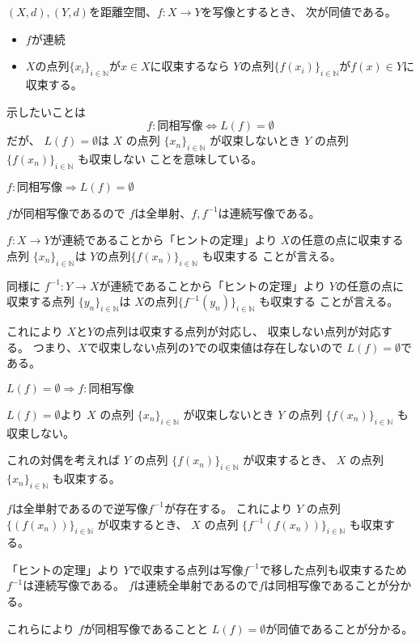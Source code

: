 \documentclass[12pt,b5paper]{ltjsarticle}
\begin{document}
$(X,d),(Y,d)$を距離空間、$f:X\to Y$を写像とするとき、
次が同値である。
\begin{itemize}
 \item $f$が連続
 \item
      $X$の点列$\{x_i\}_{i\in\mathbb{N}}$が$x\in X$に収束するなら
      $Y$の点列$\{f(x_i)\}_{i\in\mathbb{N}}$が$f(x)\in Y$に収束する。
\end{itemize}

\dotfill

示したいことは
\begin{equation}
 f:\text{同相写像} \Leftrightarrow L(f)=\emptyset
\end{equation}
だが、
$L(f)=\emptyset$は
$X$ の点列 $\{x_n\}_{i\in\mathbb{N}}$ が収束しないとき
$Y$ の点列 $\{f(x_n)\}_{i\in\mathbb{N}}$ も収束しない
ことを意味している。

\dotfill
$f:\text{同相写像} \Rightarrow L(f)=\emptyset$
\dotfill

$f$が同相写像であるので
$f$は全単射、$f,f^{-1}$は連続写像である。

$f:X\to Y$が連続であることから「ヒントの定理」より
$X$の任意の点に収束する点列 $\{x_n\}_{i\in\mathbb{N}}$は
$Y$の点列$\{f(x_n)\}_{i\in\mathbb{N}}$ も収束する
ことが言える。

同様に
$f^{-1}:Y\to X$が連続であることから「ヒントの定理」より
$Y$の任意の点に収束する点列 $\{y_n\}_{i\in\mathbb{N}}$は
$X$の点列$\{f^{-1}(y_n)\}_{i\in\mathbb{N}}$ も収束する
ことが言える。

これにより
$X$と$Y$の点列は収束する点列が対応し、
収束しない点列が対応する。
つまり、$X$で収束しない点列の$Y$での収束値は存在しないので
$L(f)=\emptyset$である。


\dotfill
$L(f)=\emptyset
\Rightarrow
f:\text{同相写像}$
\dotfill

$L(f)=\emptyset$より
$X$ の点列 $\{x_n\}_{i\in\mathbb{N}}$ が収束しないとき
$Y$ の点列 $\{f(x_n)\}_{i\in\mathbb{N}}$ も収束しない。

これの対偶を考えれば
$Y$ の点列 $\{f(x_n)\}_{i\in\mathbb{N}}$ が収束するとき、
$X$ の点列 $\{x_n\}_{i\in\mathbb{N}}$ も収束する。

$f$は全単射であるので逆写像$f^{-1}$が存在する。
これにより
$Y$ の点列 $\{(f(x_n))\}_{i\in\mathbb{N}}$ が収束するとき、
$X$ の点列 $\{f^{-1}(f(x_n))\}_{i\in\mathbb{N}}$ も収束する。

「ヒントの定理」より
$Y$で収束する点列は写像$f^{-1}$で移した点列も収束するため
$f^{-1}$は連続写像である。
$f$は連続全単射であるので$f$は同相写像であることが分かる。


\dotfill

これらにより
$f$が同相写像であることと
$L(f)=\emptyset$が同値であることが分かる。
\end{document}
